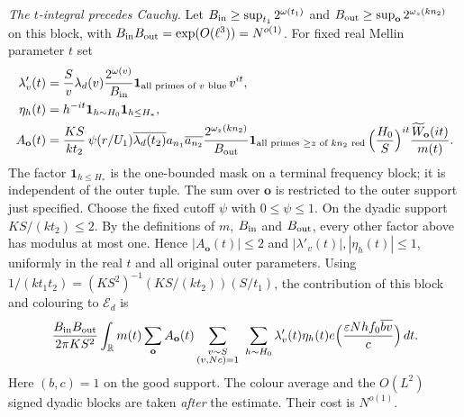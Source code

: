 \emph{The $t$-integral precedes Cauchy.}
Let $B_{\rm in}\ge\sup_{t_1}2^{\omega(t_1)}$ and
$B_{\rm out}\ge\sup_{\mathbf o}2^{\omega_z(kn_2)}$ on this block,
with $B_{\rm in}B_{\rm out}=\exp(O(\ell^3))=N^{o(1)}$.
For fixed real Mellin parameter $t$ set
\[
\begin{aligned}
 \lambda'_{v}(t)&=\frac{S}{v}\lambda_d(v)
 \frac{2^{\omega(v)}}{B_{\rm in}}
 \mathbf1_{\text{all primes of }v\text{ blue}}\,v^{it},\\
 \eta_h(t)&=h^{-it}\mathbf1_{h\sim H_0}\mathbf1_{h\le H_*},\\
 A_{\mathbf o}(t)&=\frac{KS}{kt_2}\,
 \psi(r/U_1)\overline{\lambda_d(t_2)}a_{n_1}\overline{a_{n_2}}
 \frac{2^{\omega_z(kn_2)}}{B_{\rm out}}
 \mathbf1_{\text{all primes }\ge z\text{ of }kn_2\text{ red}}\,
 \Bigl(\frac{H_0}{S}\Bigr)^{it}
 \frac{\widetilde W_{\mathbf o}(it)}{m(t)}.
\end{aligned}
\]
The factor $\mathbf1_{h\le H_*}$ is the one-bounded mask on a terminal
frequency block; it is independent of the outer tuple.
The sum over $\mathbf o$ is restricted to the outer support just
specified. Choose the fixed cutoff $\psi$ with $0\le\psi\le1$.
On the dyadic support $KS/(kt_2)\le2$. By the definitions of $m$, $B_{\rm in}$
and $B_{\rm out}$, every other factor above
has modulus at most one. Hence $|A_{\mathbf o}(t)|\le2$ and
$|\lambda'_v(t)|,|\eta_h(t)|\le1$, uniformly in the real $t$
and all original outer parameters.
Using $1/(kt_1t_2)=(KS^2)^{-1}(KS/(kt_2))(S/t_1)$,
the contribution of this block and colouring to $\mathcal E_d$ is
\[
 \frac{B_{\rm in}B_{\rm out}}{2\pi KS^2}
 \int_{\mathbb R}m(t)
 \sum_{\mathbf o}A_{\mathbf o}(t)
 \sum_{\substack{v\sim S\\(v,Nc)=1}}\ \sum_{h\sim H_0}
 \lambda'_v(t)\eta_h(t)
 e\Bigl(\frac{\varepsilon Nhf_0\overline{bv}}c\Bigr)\,dt.
\]
Here $(b,c)=1$ on the good support. The colour average and the
$O(L^2)$ signed dyadic blocks are taken \emph{after} the estimate.
Their cost is $N^{o(1)}$.

